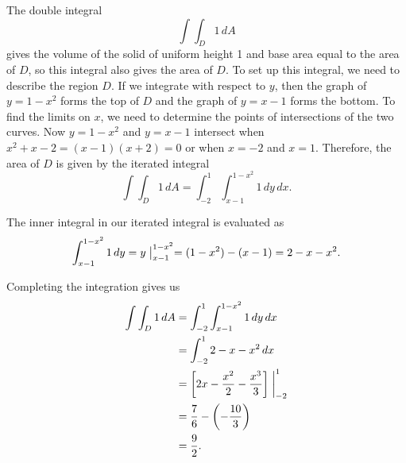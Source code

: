 \begin{bighint}

\end{bighint}
\begin{activitySolution}
\ba
\item The double integral
\[\int \int_D 1 \, dA\]
gives the volume of the solid of uniform height 1 and base area equal to the area of $D$, so this integral also gives the area of $D$. To set up this integral, we need to describe the region $D$. If we integrate with respect to $y$, then the graph of $y=1-x^2$ forms the top of $D$ and the graph of $y=x-1$ forms the bottom. To find the limits on $x$, we need to determine the points of intersections of the two curves. Now $y=1-x^2$ and $y=x-1$ intersect when $x^2+x-2 = (x-1)(x+2) = 0$ or when $x=-2$ and $x=1$. Therefore, the area of $D$ is given by the iterated integral
\[\int \int_D 1 \, dA = \int_{-2}^1 \int_{x-1}^{1-x^2} 1 \, dy \, dx.\]

\item The inner integral in our iterated integral is evaluated as 
\[\int_{x-1}^{1-x^2} 1 \, dy = y\bigm|_{x-1}^{1-x^2} = (1-x^2) - (x-1) = 2-x-x^2.\]

\item Completing the integration gives us
\begin{align*}
\int \int_D 1 \, dA &= \int_{-2}^1 \int_{x-1}^{1-x^2} 1 \, dy \, dx \\
	&= \int_{-2}^1 2-x-x^2 \, dx \\
	&= \left[2x-\frac{x^2}{2}-\frac{x^3}{3}\right]\biggm|_{-2}^1 \\
	&= \frac{7}{6} - \left(-\frac{10}{3}\right) \\
	&= \frac{9}{2}.
\end{align*}

\ea

\end{activitySolution}
\aftera
